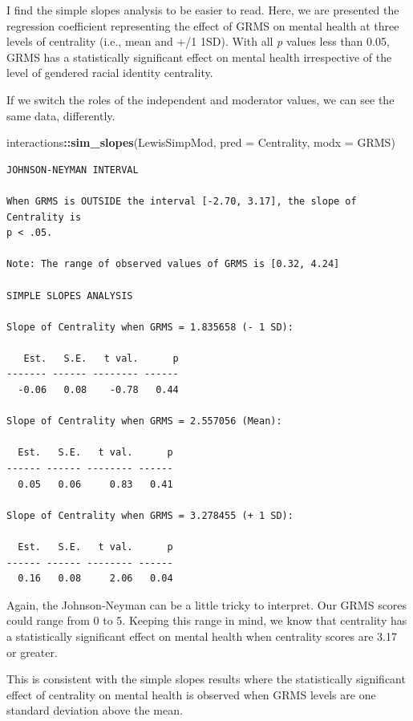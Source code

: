 \documentclass[
  11pt,
]{book}
\newenvironment{Shaded}{\begin{snugshade}}{\end{snugshade}}
\newcommand{\AttributeTok}[1]{\textcolor[rgb]{0.27,0.27,0.27}{#1}}
\newcommand{\FunctionTok}[1]{\textcolor[rgb]{0.27,0.27,0.27}{\textbf{#1}}}
\newcommand{\NormalTok}[1]{#1}
\newcommand{\SpecialCharTok}[1]{\textcolor[rgb]{0.43,0.43,0.43}{\textbf{#1}}}
\begin{document}
I find the simple slopes analysis to be easier to read. Here, we are presented the regression coefficient representing the effect of GRMS on mental health at three levels of centrality (i.e., mean and +/1 1SD). With all \emph{p} values less than 0.05, GRMS has a statistically significant effect on mental health irrespective of the level of gendered racial identity centrality.

If we switch the roles of the independent and moderator values, we can see the same data, differently.

\begin{Shaded}
\begin{Highlighting}[]
\NormalTok{interactions}\SpecialCharTok{::}\FunctionTok{sim\_slopes}\NormalTok{(LewisSimpMod, }\AttributeTok{pred =}\NormalTok{ Centrality, }\AttributeTok{modx =}\NormalTok{ GRMS)}
\end{Highlighting}
\end{Shaded}

\begin{verbatim}
JOHNSON-NEYMAN INTERVAL 

When GRMS is OUTSIDE the interval [-2.70, 3.17], the slope of Centrality is
p < .05.

Note: The range of observed values of GRMS is [0.32, 4.24]

SIMPLE SLOPES ANALYSIS 

Slope of Centrality when GRMS = 1.835658 (- 1 SD): 

   Est.   S.E.   t val.      p
------- ------ -------- ------
  -0.06   0.08    -0.78   0.44

Slope of Centrality when GRMS = 2.557056 (Mean): 

  Est.   S.E.   t val.      p
------ ------ -------- ------
  0.05   0.06     0.83   0.41

Slope of Centrality when GRMS = 3.278455 (+ 1 SD): 

  Est.   S.E.   t val.      p
------ ------ -------- ------
  0.16   0.08     2.06   0.04
\end{verbatim}

Again, the Johnson-Neyman can be a little tricky to interpret. Our GRMS scores could range from 0 to 5. Keeping this range in mind, we know that centrality has a statistically significant effect on mental health when centrality scores are 3.17 or greater.

This is consistent with the simple slopes results where the statistically significant effect of centrality on mental health is observed when GRMS levels are one standard deviation above the mean.
\end{document}
